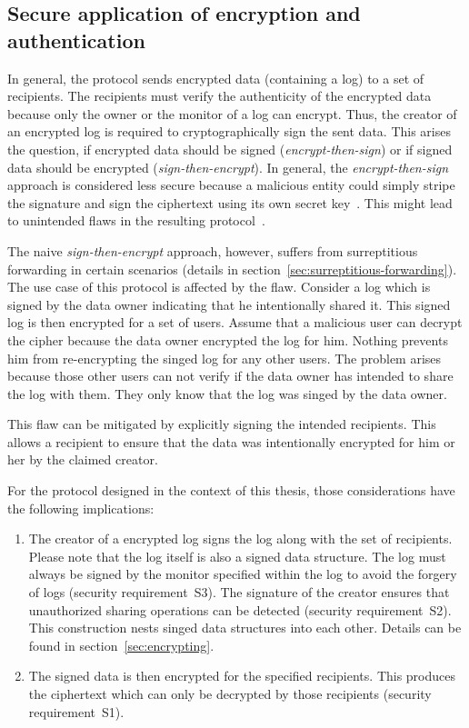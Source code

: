 \documentclass[../main.tex]{subfiles}
\begin{document}
\subsection{Secure application of encryption and authentication}
\label{sec:sign-and-encrypt}
In general, the protocol sends encrypted data (containing a log) to a set of recipients.
The recipients must verify the authenticity of the encrypted data because only the owner or the monitor of a log can encrypt.
Thus, the creator of an encrypted log is required to cryptographically sign the sent data.
This arises the question, if encrypted data should be signed (\emph{encrypt-then-sign}) or if signed data should be encrypted (\emph{sign-then-encrypt}).
In general, the \emph{encrypt-then-sign} approach is considered less secure because a malicious entity could simply stripe the signature and sign the ciphertext using its own secret key~\cite{Davis2001}.
This might lead to unintended flaws in the resulting protocol~\cite[section~11.2]{Jones2015a}.

The naive \emph{sign-then-encrypt} approach, however, suffers from surreptitious forwarding in certain scenarios (details in section~\ref{sec:surreptitious-forwarding}).
The use case of this protocol is affected by the flaw.
Consider a log which is signed by the data owner indicating that he intentionally shared it.
This signed log is then encrypted for a set of users.
Assume that a malicious user can decrypt the cipher because the data owner encrypted the log for him.
Nothing prevents him from re-encrypting the singed log for any other users.
The problem arises because those other users can not verify if the data owner has intended to share the log with them.
They only know that the log was singed by the data owner.

This flaw can be mitigated by explicitly signing the intended recipients.
This allows a recipient to ensure that the data was intentionally encrypted for him or her by the claimed creator.~\cite{Davis2001}

For the protocol designed in the context of this thesis, those considerations have the following implications:
\begin{enumerate}
    \item 
    The creator of a encrypted log signs the log along with the set of recipients.
    Please note that the log itself is also a signed data structure.
    The log must always be signed by the monitor specified within the log to avoid the forgery of logs (security requirement~S3).
    The signature of the creator ensures that unauthorized sharing operations can be detected (security requirement~S2).
    This construction nests singed data structures into each other.
    Details can be found in section~\ref{sec:encrypting}.
    \item 
    The signed data is then encrypted for the specified recipients.
    This produces the ciphertext which can only be decrypted by those recipients (security requirement~S1).
\end{enumerate}
\end{document}
